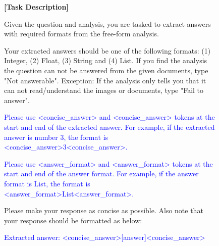 \begin{figure}[htbp]
\begin{tcolorbox}[title=The answer extracting prompt used to make long response concise during evaluation,colback=gray!5,colframe=gray!75!gray]
{\footnotesize


\vspace{0.1cm}
\textbf{[Task Description]}

Given the question and analysis, you are tasked to extract answers with required formats from the free-form analysis. 

\vspace{0.1cm}

Your extracted answers should be one of the following formats: (1) Integer, (2) Float, (3) String and (4) List. If you find the analysis the question can not be answered from the given documents, type "Not answerable". Exception: If the analysis only tells you that it can not read/understand the images or documents, type "Fail to answer". 

\vspace{0.1cm}

\textcolor{blue}{Please use <concise\_answer> and <\/concise\_answer> tokens at the start and end of the extracted answer. For example, if the extracted answer is number 3, the format is <concise\_answer>3<\/concise\_answer>.}

\vspace{0.1cm}

\textcolor{blue}{Please use <answer\_format> and <\/answer\_format> tokens at the start and end of the answer format. For example, if the answer format is List, the format is <answer\_format>List<\/answer\_format>.}


\vspace{0.1cm}

Please make your response as concise as possible. Also note that your response should be formatted as below: 


\vspace{0.2cm}


\textcolor{blue}{Extracted answer: <concise\_answer>[answer]<\/concise\_answer>}

}
\end{tcolorbox}
\end{figure}

